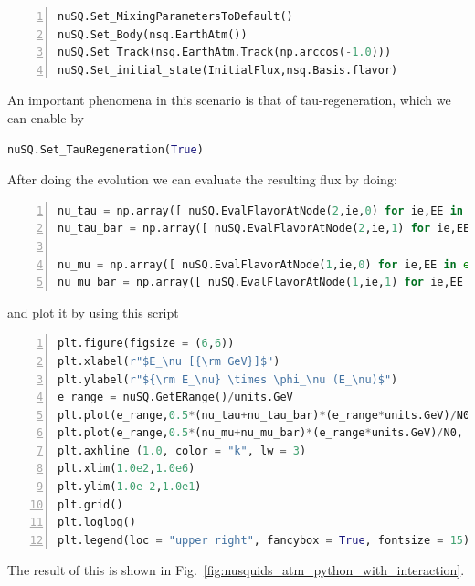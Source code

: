 \documentclass[3p,12pt]{elsarticle}
\begin{document}
\begin{lstlisting}[language=Python, frame=leftline, numbers=left, breaklines=true]
nuSQ.Set_MixingParametersToDefault()
nuSQ.Set_Body(nsq.EarthAtm())
nuSQ.Set_Track(nsq.EarthAtm.Track(np.arccos(-1.0)))
nuSQ.Set_initial_state(InitialFlux,nsq.Basis.flavor)
\end{lstlisting}
An important phenomena in this scenario is that of tau-regeneration, which we can enable by
\begin{lstlisting}[language=Python, breaklines=true]
nuSQ.Set_TauRegeneration(True)
\end{lstlisting}

After doing the evolution we can evaluate the resulting flux by doing:
\begin{lstlisting}[language=Python, frame=leftline, numbers=left, breaklines=true]
nu_tau = np.array([ nuSQ.EvalFlavorAtNode(2,ie,0) for ie,EE in enumerate(nuSQ.GetERange())])
nu_tau_bar = np.array([ nuSQ.EvalFlavorAtNode(2,ie,1) for ie,EE in enumerate(nuSQ.GetERange())])

nu_mu = np.array([ nuSQ.EvalFlavorAtNode(1,ie,0) for ie,EE in enumerate(nuSQ.GetERange())])
nu_mu_bar = np.array([ nuSQ.EvalFlavorAtNode(1,ie,1) for ie,EE in enumerate(nuSQ.GetERange())])
\end{lstlisting}

and plot it by using this script

\begin{lstlisting}[language=Python, frame=leftline, numbers=left, breaklines=true]
plt.figure(figsize = (6,6))
plt.xlabel(r"$E_\nu [{\rm GeV}]$")
plt.ylabel(r"${\rm E_\nu} \times \phi_\nu (E_\nu)$")
e_range = nuSQ.GetERange()/units.GeV
plt.plot(e_range,0.5*(nu_tau+nu_tau_bar)*(e_range*units.GeV)/N0, lw = 3, label =r"$\nu_\tau + \bar{\nu}_\tau$", color = "blue")
plt.plot(e_range,0.5*(nu_mu+nu_mu_bar)*(e_range*units.GeV)/N0, lw = 3, label =r"$\nu_\mu + \bar{\nu}_\mu$", color = "red")
plt.axhline (1.0, color = "k", lw = 3)
plt.xlim(1.0e2,1.0e6)
plt.ylim(1.0e-2,1.0e1)
plt.grid()
plt.loglog()
plt.legend(loc = "upper right", fancybox = True, fontsize = 15)
\end{lstlisting}
The result of this is shown in Fig.~\ref{fig:nusquids_atm_python_with_interaction}.
\end{document}
